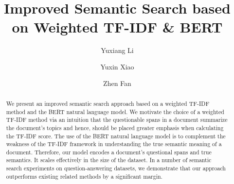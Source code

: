 \documentclass[sigconf]{acmart}
\begin{document}
\title{Improved Semantic Search based on Weighted TF-IDF \& BERT}


\author{Yuxiang Li}

\author{Yuxin Xiao}

\author{Zhen Fan}


\begin{abstract}
We present an improved semantic search approach based on a weighted TF-IDF method and the BERT natural language model. We motivate the choice of a weighted TF-IDF method via an intuition that the questionable spans in a document summarize the document's topics and hence, should be placed greater emphasis when calculating the TF-IDF score. The use of the BERT natural language model is to complement the weakness of the TF-IDF framework in understanding the true semantic meaning of a document. Therefore, our model encodes a document's questional spans and true semantics. It scales effectively in the size of the dataset. In a number of semantic search experiments on question-answering datasets, we demonstrate that our approach outperforms existing related methods by a significant margin.
\end{abstract}


\maketitle

% 

% 
% 
\end{document}
